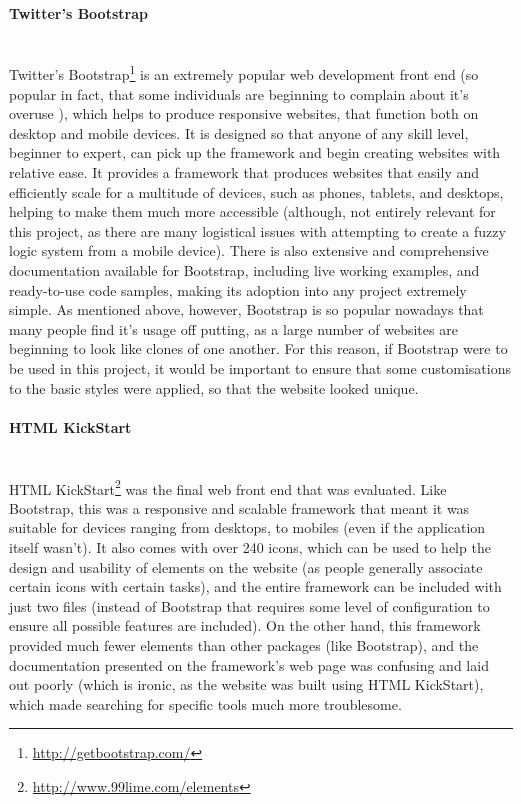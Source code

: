 \paragraph{Twitter's Bootstrap}\ \\
Twitter's Bootstrap\footnote{\url{http://getbootstrap.com/}} is an extremely popular web development front end (so popular in fact, that some individuals are beginning to complain about it's overuse \cite{gross2013bootstrap}), which helps to produce responsive websites, that function both on desktop and mobile devices. It is designed so that anyone of any skill level, beginner to expert, can pick up the framework and begin creating websites with relative ease. It provides a framework that produces websites that easily and efficiently scale for a multitude of devices, such as phones, tablets, and desktops, helping to make them much more accessible (although, not entirely relevant for this project, as there are many logistical issues with attempting to create a fuzzy logic system from a mobile device). There is also extensive and comprehensive documentation available for Bootstrap, including live working examples, and ready-to-use code samples, making its adoption into any project extremely simple. As mentioned above, however, Bootstrap is so popular nowadays that many people find it's usage off putting, as a large number of websites are beginning to look like clones of one another. For this reason, if Bootstrap were to be used in this project, it would be important to ensure that some customisations to the basic styles were applied, so that the website looked unique.

\paragraph{HTML KickStart}\ \\
HTML KickStart\footnote{\url{http://www.99lime.com/elements}} was the final web front end that was evaluated. Like Bootstrap, this was a responsive and scalable framework that meant it was suitable for devices ranging from desktops, to mobiles (even if the application itself wasn't). It also comes with over 240 icons, which can be used to help the design and usability of elements on the website (as people generally associate certain icons with certain tasks), and the entire framework can be included with just two files (instead of Bootstrap that requires some level of configuration to ensure all possible features are included). On the other hand, this framework provided much fewer elements than other packages (like Bootstrap), and the documentation presented on the framework's web page was confusing and laid out poorly (which is ironic, as the website was built using HTML KickStart), which made searching for specific tools much more troublesome. 

